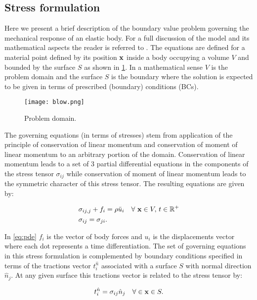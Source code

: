 \subsection{Stress formulation}
Here we present a brief description of the boundary value problem governing the mechanical response of an elastic body. For a full discussion of the model and its mathematical aspects the reader is referred to \cite{shames1997elastic}. The equations are defined for a material point defined by its position $\vb{x}$ inside a body occupying a volume $V$ and bounded by the surface $S$ as shown in \cref{fig:blowL}. In a mathematical sense $V$ is the problem domain and the surface $S$ is the boundary where the solution is expected to be given in terms of prescribed (boundary) conditions (BCs).


\begin{figure}[H]
\centering
\texttt{[image: blow.png]}
\caption{Problem domain.}
\label{fig:blowL}
\end{figure}

The governing equations (in terms of stresses) stem from application of the principle of conservation of linear momentum and conservation of moment of linear momentum to an arbitrary portion of the domain. Conservation of linear momentum leads to a set of 3 partial differential equations in the components of the stress tensor $\sigma_{ij}$ while conservation of moment of linear momentum leads to the symmetric character of this stress tensor. The resulting equations are given by:

\begin{equation} \label{eq:pde}
\begin{aligned}
&\sigma_{ij,j} + {f_i} = \rho\ddot{u}_i \quad \forall\ \vb{x} \in V,\, t \in \mathbb{R}^{+}\\
&\sigma_{ij}=\sigma _{ji}.
\end{aligned} 
\end{equation}

In \ref{eq:pde} $f_i$ is the vector of body forces and $u_i$ is the displacements vector where each dot represents a time differentiation. The set of governing equations in this stress formulation is complemented by boundary conditions specified in terms of the tractions vector $t_i^{\hat n}$ associated with a surface $S$ with normal direction $\hat{n}_{j}$. At any given surface this tractions vector is related to the stress tensor by:


\[
t_i^{\hat n} = \sigma_{ij} \hat{n}_{j} \quad \forall \in \vb{x} \in S.
\]



